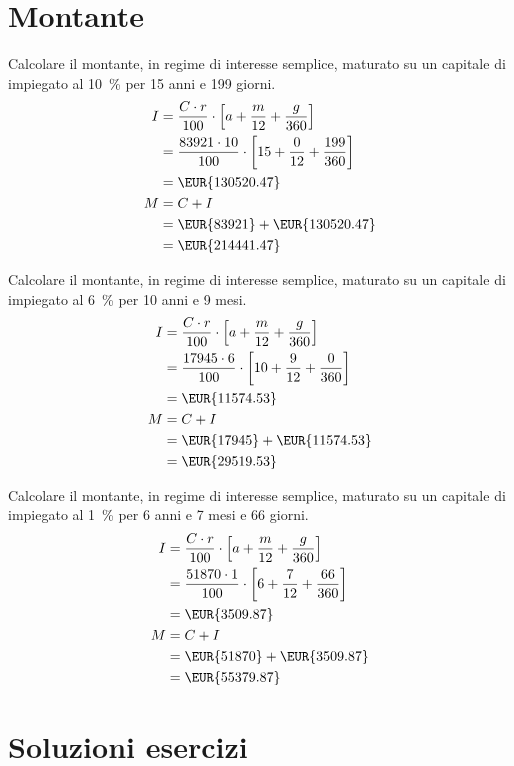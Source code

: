 \section{Montante}
\begin{exercise}
	Calcolare il montante, in regime di interesse semplice, maturato su un capitale di  impiegato al \SI{10}{\percent} per \num{15} anni e \num{199} giorni.
	\tcblower
	\begin{align*}
		I={}&\dfrac{C\cdot r}{100}\cdot\left[a+ \dfrac{m}{12}+\dfrac{g}{360}\right]\\
		={}&\dfrac{83921\cdot 10}{100}\cdot\left[15+ \dfrac{0}{12}+\dfrac{199}{360}\right]\\
		={}&\mbox{\EUR{130520.47}}\\
		M={}&C+I\\
		={}&\mbox{\EUR{83921}}+\mbox{\EUR{130520.47}}\\
		={}&\mbox{\EUR{214441.47}}\\
	\end{align*}
\end{exercise}
\begin{exercise}
	Calcolare il montante, in regime di interesse semplice, maturato su un capitale di  impiegato al \SI{6}{\percent} per \num{10} anni e \num{9} mesi.
	\tcblower
	\begin{align*}
		I={}&\dfrac{C\cdot r}{100}\cdot\left[a+ \dfrac{m}{12}+\dfrac{g}{360}\right]\\
		={}&\dfrac{17945\cdot 6}{100}\cdot\left[10+ \dfrac{9}{12}+\dfrac{0}{360}\right]\\
		={}&\mbox{\EUR{11574.53}}\\
		M={}&C+I\\
		={}&\mbox{\EUR{17945}}+\mbox{\EUR{11574.53}}\\
		={}&\mbox{\EUR{29519.53}}\\
	\end{align*}
\end{exercise}
\begin{exercise}
	Calcolare il montante, in regime di interesse semplice, maturato su un capitale di  impiegato al \SI{1}{\percent} per \num{6} anni e \num{7} mesi e \num{66} giorni.
	\tcblower
	\begin{align*}
		I={}&\dfrac{C\cdot r}{100}\cdot\left[a+ \dfrac{m}{12}+\dfrac{g}{360}\right]\\
		={}&\dfrac{51870\cdot 1}{100}\cdot\left[6+ \dfrac{7}{12}+\dfrac{66}{360}\right]\\
		={}&\mbox{\EUR{3509.87}}\\
		M={}&C+I\\
		={}&\mbox{\EUR{51870}}+\mbox{\EUR{3509.87}}\\
		={}&\mbox{\EUR{55379.87}}\\
	\end{align*}
\end{exercise}
\tcbstoprecording
\newpage
\section{Soluzioni esercizi}
\tcbinputrecords
